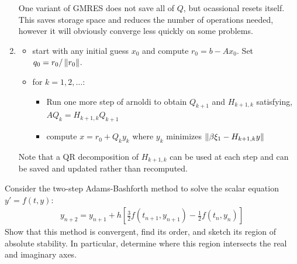 \documentclass[10pt]{article}
\begin{document}
\begin{solution}[Solution]
\begin{enumerate}[]
One variant of GMRES does not save all of \( Q \), but ocassional resets itself. This saves storage space and reduces the number of operations needed, however it will obviously converge less quickly on some problems.

\item
\begin{itemize}
    \item start with any initial guess \( x_0 \) and compute \( r_0 = b-Ax_0 \). Set \( q_0 = r_0 / \left\lVert r_0\right\rVert \).
    \item for \( k=1,2,\ldots \):
    \begin{itemize}
        \item Run one more step of arnoldi to obtain \( Q_{k+1} \) and \( H_{k+1,k} \) satisfying, \( AQ_k = H_{k+1,k}Q_{k+1} \)
        \item compute \( x = r_0 + Q_ky_k \) where \( y_k \) minimizes \( \left\lVert\beta \xi_1 - H_{k+1,k} y\right\rVert \)
    \end{itemize}
\end{itemize}

Note that a QR decomposition of \( H_{k+1,k} \) can be used at each step and can be saved and updated rather than recomputed.

\end{enumerate}
\end{solution}


\begin{problem}
Consider the two-step Adams-Bashforth method to solve the scalar equation \( y' = f(t,y) \):
\begin{align*}
    y_{n+2} = y_{n+1} + h \left[ \frac{3}{2} f(t_{n+1},y_{n+1})-\frac{1}{2} f(t_n,y_n) \right]
\end{align*}
Show that this method is convergent, find its order, and sketch its region of absolute stability. In particular, determine where this region intersects the real and imaginary axes.
\end{problem}
\end{document}

